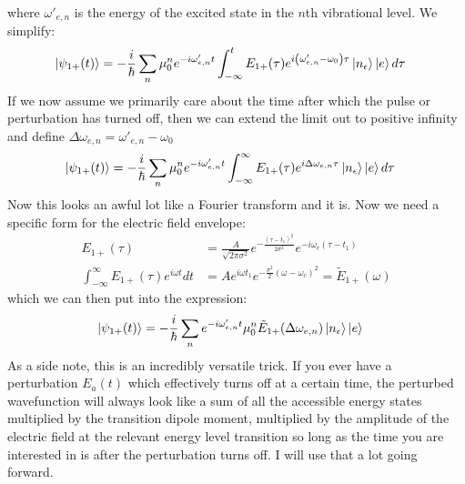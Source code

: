 where $\omega'_{e, n}$ is the energy of the excited state in the $n$th vibrational level.  We simplify:
\begin{align}
	\ket{\psi_{1+}(t)} &= -\frac{i}{\hbar} \sum_n \mu_{0}^{n}  e^{-i \omega'_{e, n} t} \int_{-\infty}^{t} E_{1+} (\tau) e^{i \left( \omega'_{e, n} - \omega_0 \right) \tau} \ket{n_{\epsilon}}\ket{e}d\tau
\end{align}
If we now assume we primarily care about the time after which the pulse or perturbation has turned off, then we can extend the limit out to positive infinity  and define $\Delta \omega_{e, n} =  \omega'_{e, n} - \omega_0$
\begin{align}
	\ket{\psi_{1+}(t)} &= -\frac{i}{\hbar} \sum_n \mu_{0}^{n}  e^{-i \omega'_{e, n} t} \int_{-\infty}^{\infty} E_{1+} (\tau) e^{i \Delta \omega_{e, n}\tau} \ket{n_{\epsilon}}\ket{e}d\tau
\end{align}
Now this looks an awful lot like a Fourier transform and it is.  Now we need a specific form for the electric field envelope:
\begin{align}
	 E_{1+} (\tau) &= \frac{A}{\sqrt{2 \pi \sigma^2}} e^{-\frac{(\tau - t_1)^2}{2 \sigma^2}} e^{-i \omega_c(\tau - t_1)} \\
	 \int_{-\infty}^{\infty}  E_{1+} (\tau)  e^{i \omega t} dt &= A e^{i \omega t_1} e^{- \frac{\sigma^2}{2} \left(  \omega - \omega_c\right)^2} = \tilde{E}_{1+} (\omega)
\end{align}
which we can then put into the expression:
\begin{align}
	\ket{\psi_{1+}(t)} &= -\frac{i}{\hbar} \sum_n e^{-i \omega'_{e, n} t}  \mu_{0}^{n}   \tilde{E}_{1+} (\Delta \omega_{e, n}) \ket{n_{\epsilon}}\ket{e}
\end{align}
As a side note, this is an incredibly versatile trick.  If you ever have a perturbation $E_a(t)$ which effectively turns off at a certain time, the perturbed wavefunction will always look like a sum of all the accessible energy states multiplied by the transition dipole moment, multiplied by the amplitude of the electric field at the relevant energy level transition so long as the time you are interested in is after the perturbation turns off.  I will use that a lot going forward.


